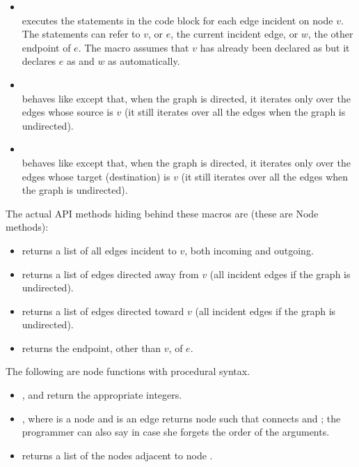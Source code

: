 \begin{itemize}

\item
{}\\
executes the statements in the code block for each edge incident on node $v$.
The statements can refer to $v$, or $e$, the current incident edge,
or $w$, the other endpoint of $e$.
The macro assumes that $v$ has already been declared as 
but it declares $e$ as  and $w$ as  automatically.

\item
{}\\
behaves like  except that, when the graph is directed,
it iterates only over the edges whose source is $v$ (it still iterates over all the edges when the graph is undirected). 

\item
{}\\
behaves like  except that, when the graph is directed,
it iterates only over the edges whose target (destination) is $v$ (it still iterates over all the edges when the graph is undirected). 

\end{itemize}

The actual API methods hiding behind these macros are (these are Node methods):

\begin{itemize}
\item
{} returns a list of all edges
incident to $v$, both incoming and outgoing.
\item
{} returns a list of edges
directed away from $v$ (all incident edges if the graph is undirected).
\item
{} returns a list of edges
directed toward $v$ (all incident edges if the graph is undirected).
\item
{} returns the endpoint, other than $v$, of $e$.
\end{itemize}

The following are node functions with procedural syntax.

\begin{itemize}
\item {},  and  return the appropriate
integers.
\item {}, where  is a node and  is an edge
returns node  such that  connects  and ;
the programmer can also say  in case she forgets the order
of the arguments.
\item {} returns a list of the nodes adjacent to node .
\end{itemize}

